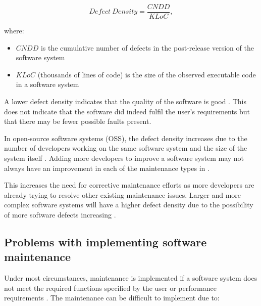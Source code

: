 \begin{equation}
	\label{eq:ch1_defectDensity}
	Defect~Density = \frac{CNDD}{KLoC},
\end{equation}

where:

\begin{itemize}
	\item $CNDD$ is the cumulative number of defects in the post-release version of the software system
	\item $KLoC$ (thousands of lines of code) is the size of the observed executable code in a software system 
\end{itemize}

A lower defect density indicates that the quality of the software is good \cite{Shah2012, Alenezi2016}. This does not indicate that the software did indeed fulfil the user's requirements but that there may be fewer possible faults present. \par In open-source software systems (OSS), the defect density increases due to the number of developers working on the same software system and the size of the system itself \cite{Rahmani2010}. Adding more developers to improve a software system may not always have an improvement in each of the maintenance types in .\par This increases the need for corrective maintenance efforts as more developers are already trying to resolve other existing maintenance issues. Larger and more complex software systems will have a higher defect density due to the possibility of more software defects increasing \cite{SourceForged2009}.

\subsection{Problems with implementing software maintenance}\label{sec:ch1_maintenanceProblems}
Under most circumstances, maintenance is implemented if a software system does not meet the required functions specified by the user or performance requirements \cite{Ogheneovo2014, Sneed2004}. The maintenance can be difficult to implement due to:

